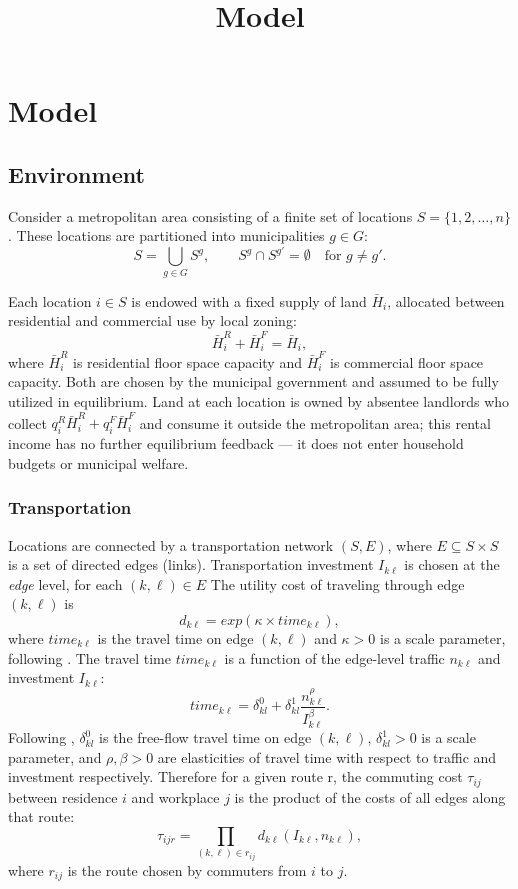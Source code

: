 \documentclass[12pt, a4paper]{article}
\title{Model}
\author{}
\date{}
\theoremstyle{definition}
\theoremstyle{remark}
\begin{document}
\maketitle

\section{Model}

\subsection{Environment}

Consider a metropolitan area consisting of a finite set of locations $S = \{1, 2, \ldots, n\}$. These locations are partitioned into municipalities $g \in G$:
\[
S = \bigcup_{g \in G} S^g, \qquad S^g \cap S^{g'} = \emptyset \quad \text{for } g \neq g'.
\]

Each location $i \in S$ is endowed with a fixed supply of land $\bar{H}_i$, allocated between residential and commercial use by local zoning:
\[
\bar{H}_i^R + \bar{H}_i^F = \bar{H}_i,
\]
where $\bar{H}_i^R$ is residential floor space capacity and $\bar{H}_i^F$ is commercial floor space capacity. Both are chosen by the municipal government and assumed to be fully utilized in equilibrium. Land at each location is owned by absentee landlords who collect $q_i^R\bar H_i^R + q_i^F\bar H_i^F$ and consume it outside the metropolitan area; this rental income has no further equilibrium feedback — it does not enter household budgets or municipal welfare.

\subsubsection{Transportation}
Locations are connected by a transportation network $(S, E)$, where $E \subseteq S \times S$ is a set of directed edges (links). Transportation investment $I_{k\ell}$ is chosen at the \emph{edge} level, for each $(k,\ell) \in E$ The utility cost of traveling through edge $(k,\ell)$ is
\[
d_{k\ell} = exp(\kappa \times time_{k\ell}),
\]
where $time_{k\ell}$ is the travel time on edge $(k,\ell)$ and $\kappa > 0$ is a scale parameter, following \cite{Ahlfeldt2015-zb}. The travel time $time_{k\ell}$ is a function of the edge-level traffic $n_{k\ell}$ and investment $I_{k\ell}$:
\[
time_{k\ell} = \delta_{kl}^{0}+\delta_{kl}^{1}\frac{n_{k\ell}^{\rho}}{I_{k\ell}^{\beta}}.
\]
Following \cite{Fajgelbaum2020-yv}, $\delta_{kl}^{0}$ is the free-flow travel time on edge $(k,\ell)$, $\delta_{kl}^{1} > 0$ is a scale parameter, and $\rho, \beta > 0$ are elasticities of travel time with respect to traffic and investment respectively. 
Therefore for a given route r, the commuting cost $\tau_{ij}$ between residence $i$ and workplace $j$ is the product of the costs of all edges along that route:    
\[
\tau_{ijr} = \prod_{(k,\ell) \in r_{ij}} d_{k\ell}(I_{k\ell}, n_{k\ell}),
\]
where $r_{ij}$ is the route chosen by commuters from $i$ to $j$. 
\end{document}
